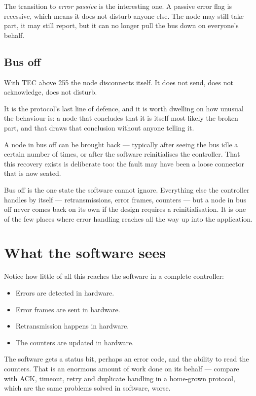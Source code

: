 The transition to \emph{error passive} is the interesting one. A passive error flag is recessive,
which means it does not disturb anyone else. The node may still take part, it may still report,
but it can no longer pull the bus down on everyone's behalf.

\subsection{Bus off}

With TEC above 255 the node disconnects itself. It does not send, does not acknowledge, does not
disturb.

It is the protocol's last line of defence, and it is worth dwelling on how unusual the behaviour
is: a node that concludes that it is itself most likely the broken part, and that draws that
conclusion without anyone telling it.

A node in bus off can be brought back --- typically after seeing the bus idle a certain number of
times, or after the software reinitialises the controller. That this recovery exists is deliberate
too: the fault may have been a loose connector that is now seated.

\begin{aside}
 Bus off is the one state the software cannot ignore. Everything else
the controller handles by itself --- retransmissions, error frames, counters --- but a node in bus
off never comes back on its own if the design requires a reinitialisation. It is one of the few
places where error handling reaches all the way up into the application.
\end{aside}

\section{What the software sees}

Notice how little of all this reaches the software in a complete controller:

\begin{itemize}
  \item Errors are detected in hardware.
  \item Error frames are sent in hardware.
  \item Retransmission happens in hardware.
  \item The counters are updated in hardware.
\end{itemize}

The software gets a status bit, perhaps an error code, and the ability to read the counters. That
is an enormous amount of work done on its behalf --- compare with ACK, timeout, retry and duplicate
handling in a home-grown protocol, which are the same problems solved in software, worse.

